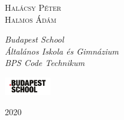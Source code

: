 \begin{titlepage}
	{\scshape\Large Halácsy Péter \\ Halmos Ádám \\} %
	
	\vspace{0.5\baselineskip} %
	
	\textit{Budapest School \\ Általános Iskola és Gimnázium \\} %
	\vspace{0.3\baselineskip}
	\textit{BPS Code Technikum} %
	
	\vfill %
	
	
	\includegraphics[width=2cm]{logo}
	
	\vspace{0.3\baselineskip} %
	
	2020 %
	
	

\end{titlepage}